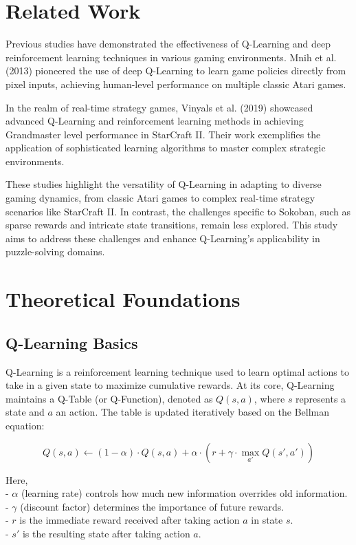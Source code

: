 \documentclass[10pt,twocolumn]{article}
\begin{document}
\section{Related Work}

Previous studies have demonstrated the effectiveness of Q-Learning and deep reinforcement learning techniques in various gaming environments. Mnih et al. (2013) pioneered the use of deep Q-Learning to learn game policies directly from pixel inputs, achieving human-level performance on multiple classic Atari games.

In the realm of real-time strategy games, \cite{vinyals2019grandmaster} Vinyals et al. (2019) showcased advanced Q-Learning and reinforcement learning methods in achieving Grandmaster level performance in StarCraft II. Their work exemplifies the application of sophisticated learning algorithms to master complex strategic environments.

These studies highlight the versatility of Q-Learning in adapting to diverse gaming dynamics, from classic Atari games to complex real-time strategy scenarios like StarCraft II. In contrast, the challenges specific to Sokoban, such as sparse rewards and intricate state transitions, remain less explored. This study aims to address these challenges and enhance Q-Learning's applicability in puzzle-solving domains.

\section{Theoretical Foundations}

\subsection{Q-Learning Basics}

Q-Learning is a reinforcement learning technique used to learn optimal actions to take in a given state to maximize cumulative rewards. At its core, Q-Learning maintains a Q-Table (or Q-Function), denoted as \( Q(s, a) \), where \( s \) represents a state and \( a \) an action. The table is updated iteratively based on the Bellman equation:

\[
    Q(s, a) \leftarrow (1 - \alpha) \cdot Q(s, a) + \alpha \cdot \left( r + \gamma \cdot \max_{a'} Q(s', a') \right)
\]

Here, \\
- \( \alpha \) (learning rate) controls how much new information overrides old information. \\
- \( \gamma \) (discount factor) determines the importance of future rewards. \\
- \( r \) is the immediate reward received after taking action \( a \) in state \( s \). \\
- \( s' \) is the resulting state after taking action \( a \). \\
\end{document}
